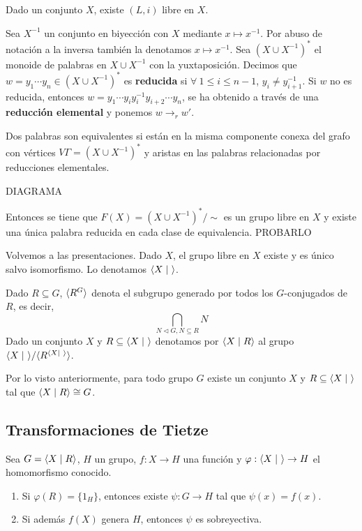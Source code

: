 \documentclass[twoside, 11pt]{article}
\begin{document}
\begin{teorema}
Dado un conjunto $X$, existe $(L,i)$ libre en $X$.
\end{teorema}
\begin{dem}
Sea $X^{-1}$ un conjunto en biyección con $X$ mediante $x\mapsto x^{-1}$. Por abuso de notación a la inversa también la denotamos $x\mapsto x^{-1}$. Sea $(X\cup X^{-1})^*$ el monoide de palabras en $X\cup X^{-1}$ con la yuxtaposición. Decimos que $w=y_1\cdots y_n\in (X\cup X^{-1})^*$ es \textbf{reducida} si $\forall\ 1\leq i\leq n-1$, $y_i\neq y_{i+1}^{-1}$. Si $w$ no es reducida, entonces $w=y_1\cdots y_iy_i^{-1}y_{i+2}\cdots y_n$, se ha obtenido a través de una \textbf{reducción elemental} y ponemos $w\to_r w'$. 

Dos palabras son equivalentes si están en la misma componente conexa del grafo con vértices $V\Gamma=(X\cup X^{-1})^*$ y aristas en las palabras relacionadas por reducciones elementales. 

DIAGRAMA

Entonces se tiene que $F(X)=(X\cup X^{-1})^*/\sim$ es un grupo libre en $X$ y existe una única palabra reducida en cada clase de equivalencia. PROBARLO 

\QED
\end{dem}

Volvemos a las presentaciones. Dado $X$, el grupo libre en $X$ existe y es único salvo isomorfismo. Lo denotamos $\langle{X\mid\ }\rangle$. 

Dado $R\subseteq G$, $\langle{R^G}\rangle$ denota el subgrupo generado por todos los $G$-conjugados de $R$, es decir, $$\bigcap_{N\triangleleft G, N\subseteq R} N$$
Dado un conjunto $X$ y $R\subseteq\langle{X\mid\ }\rangle$ denotamos por $\langle{X\mid R}\rangle$ al grupo $\gene{X\mid\ }/\gene{R^{\gene{X\mid\ }}}$.

Por lo visto anteriormente, para todo grupo $G$ existe un conjunto $X$ y $R\subseteq\langle{X\mid\ }\rangle$ tal que $\langle{X\mid R}\rangle\cong G$.
\subsection{Transformaciones de Tietze}
\begin{teorema}
Sea $G=\langle{X\mid R}\rangle$, $H$ un grupo, $f:X\to H$ una función y $\varphi:\langle{X\mid\ }\rangle\to H$ el homomorfismo conocido. 
\begin{enumerate}
\item Si $\varphi(R)=\{	1_H\}$, entonces existe $\psi:G\to H$ tal que $\psi(x)=f(x)$.
\item Si además $f(X)$ genera $H$, entonces $\psi$ es sobreyectiva.
\end{enumerate}
\end{teorema}
\end{document}
